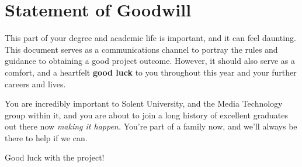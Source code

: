 \chapter{Statement of Goodwill}

This part of your degree and academic life is important, and it can feel daunting. This document serves as a communications channel to portray the rules and guidance to obtaining a good project outcome. However, it should also serve as a comfort, and a heartfelt \textbf{good luck} to you throughout this year and your further careers and lives.

You are incredibly important to Solent University, and the Media Technology group within it, and you are about to join a long history of excellent graduates out there now \textit{making it happen.} You're part of a family now, and we'll always be there to help if we can. 

Good luck with the project!